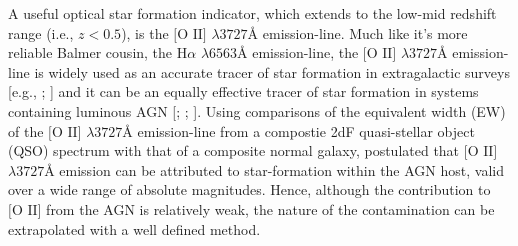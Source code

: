A useful optical star formation indicator, which extends to the low-mid redshift range (i.e., ${z}<{0.5}$), is the $\text{[O II]}$ $\lambda{3727}Å$ emission-line. Much like it's more reliable Balmer cousin, the $\text{H}\alpha$ $\lambda 6563Å$ emission-line, the $\text{[O II]}$ $\lambda{3727}Å$ emission-line is widely used as an accurate tracer of star formation in extragalactic surveys [e.g., \cite{Lilly_1996}; \cite{Hippelein_2003}] and it can be an equally effective tracer of star formation in systems containing luminous AGN [\cite{2006ApJ...642..702K}; \cite{2009ApJ...696..396S}; \cite{2012MNRAS.427.2401K}]. Using comparisons of the equivalent width (EW) of the $\text{[O II]}$  $\lambda{3727}Å$ emission-line from a compostie 2dF quasi-stellar object (QSO) spectrum with that of a composite normal galaxy, \cite{2002MNRAS.337..275C} postulated that $\text{[O II]}$ $\lambda{3727}Å$ emission can be attributed to star-formation within the AGN host, valid over a wide range of absolute magnitudes. Hence, although the contribution to $\text{[O II]}$ from the AGN is relatively weak, the nature of the contamination can be extrapolated with a well defined method.   

